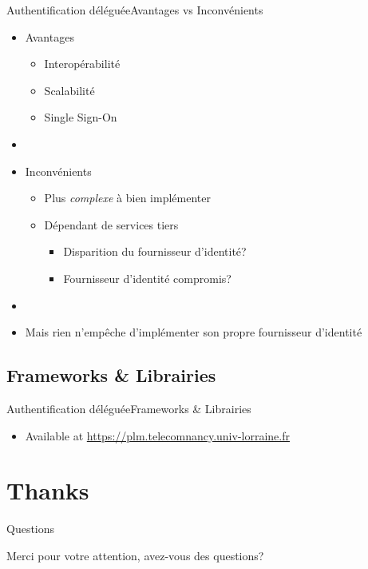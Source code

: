 \documentclass{beamer}
\begin{document}
\begin{frame}{Authentification déléguée}{Avantages vs Inconvénients}
  \begin{center}
    \begin{itemize}
      \item Avantages
      \begin{itemize}
        \item Interopérabilité
        \item Scalabilité
        \item Single Sign-On
      \end{itemize}
      \pause
      \item[~]
      \item Inconvénients
      \begin{itemize}
        \item Plus \emph{complexe} à bien implémenter
        \item Dépendant de services tiers
        \begin{itemize}
          \item Disparition du fournisseur d'identité?
          \item Fournisseur d'identité compromis?
        \end{itemize}
      \end{itemize}
      \pause
      \item[~]
      \item Mais rien n'empêche d'implémenter son propre fournisseur d'identité
    \end{itemize}
  \end{center}
\end{frame}

\subsection{Frameworks \& Librairies}

\begin{frame}{Authentification déléguée}{Frameworks \& Librairies}
  \begin{center}
    \begin{itemize}
    \item Available at \url{https://plm.telecomnancy.univ-lorraine.fr}
    \end{itemize}
  \end{center}
\end{frame}

\section*{Thanks}

\begin{frame}{Questions}
  \begin{center}
    Merci pour votre attention, avez-vous des questions?
  \end{center}
\end{frame}
\end{document}
